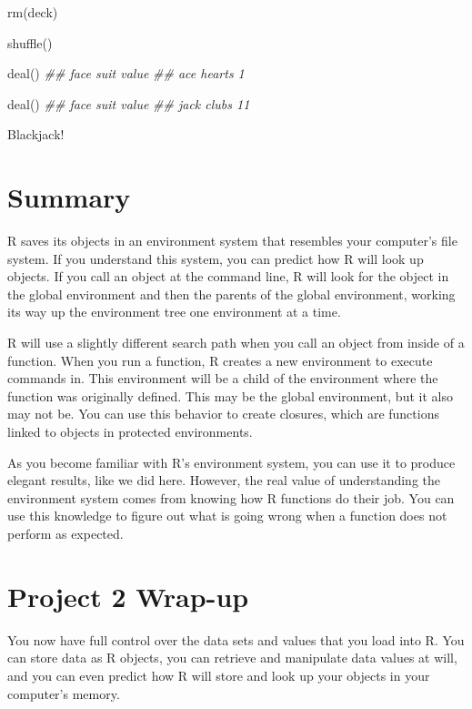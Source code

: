 \documentclass[
  letterpaper,
  DIV=11,
  numbers=noendperiod]{scrbook}
\newenvironment{Shaded}{\begin{snugshade}}{\end{snugshade}}
\newcommand{\DocumentationTok}[1]{\textcolor[rgb]{0.37,0.37,0.37}{\textit{#1}}}
\newcommand{\FunctionTok}[1]{\textcolor[rgb]{0.28,0.35,0.67}{#1}}
\newcommand{\NormalTok}[1]{\textcolor[rgb]{0.00,0.23,0.31}{#1}}
\begin{document}
\begin{Shaded}
\begin{Highlighting}[]
\FunctionTok{rm}\NormalTok{(deck)}

\FunctionTok{shuffle}\NormalTok{()}

\FunctionTok{deal}\NormalTok{()}
\DocumentationTok{\#\# face   suit value}
\DocumentationTok{\#\#  ace hearts     1}

\FunctionTok{deal}\NormalTok{()}
\DocumentationTok{\#\# face  suit value}
\DocumentationTok{\#\# jack clubs    11}
\end{Highlighting}
\end{Shaded}

Blackjack!

\section{Summary}\label{summary-5}

R saves its objects in an environment system that resembles your
computer's file system. If you understand this system, you can predict
how R will look up objects. If you call an object at the command line, R
will look for the object in the global environment and then the parents
of the global environment, working its way up the environment tree one
environment at a time.

R will use a slightly different search path when you call an object from
inside of a function. When you run a function, R creates a new
environment to execute commands in. This environment will be a child of
the environment where the function was originally defined. This may be
the global environment, but it also may not be. You can use this
behavior to create closures, which are functions linked to objects in
protected environments.

As you become familiar with R's environment system, you can use it to
produce elegant results, like we did here. However, the real value of
understanding the environment system comes from knowing how R functions
do their job. You can use this knowledge to figure out what is going
wrong when a function does not perform as expected.

\section{Project 2 Wrap-up}\label{project-2-wrap-up}

You now have full control over the data sets and values that you load
into R. You can store data as R objects, you can retrieve and manipulate
data values at will, and you can even predict how R will store and look
up your objects in your computer's memory.
\end{document}

